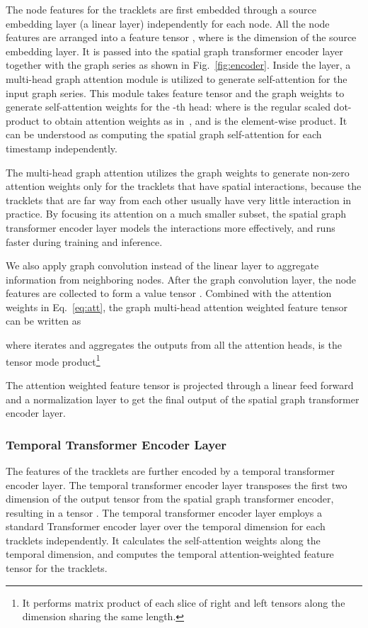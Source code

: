 \documentclass[10pt,twocolumn,letterpaper]{article}
\begin{document}
The node features for the tracklets are first embedded through a source embedding layer (a linear layer) independently for each node.  All the node features are arranged into a feature tensor  , where  is the dimension of the source embedding layer. It is passed into the spatial graph transformer encoder layer together with the graph series as shown in Fig.~\ref{fig:encoder}. Inside the layer, a multi-head graph attention module is utilized to generate self-attention for the input graph series. This module takes feature tensor  and the graph weights  to generate self-attention weights for the -th head:
\vspace{-1mm}
where  is the regular scaled dot-product to obtain attention weights as in~\cite{vaswani2017attention}, and  is the element-wise product. It can be understood as computing the spatial graph self-attention for each timestamp independently.

The multi-head graph attention utilizes the graph weights  to generate non-zero attention weights only for the tracklets that have spatial interactions, because the tracklets that are far way from each other usually have very little interaction in practice. By focusing its attention on a much smaller subset, the spatial graph transformer encoder layer models the interactions more effectively, and runs faster during training and inference.

We also apply graph convolution instead of the linear layer to aggregate information from neighboring nodes. After the graph convolution layer, the node features are collected to form a value tensor . Combined with the attention weights in Eq.~\ref{eq:att}, the graph multi-head attention weighted feature tensor can be written as 

where  iterates and aggregates the outputs from all the attention heads,  is the tensor mode product\footnote{It performs matrix product of each slice of right and left tensors along the dimension sharing the same length.}

The attention weighted feature tensor is projected through a linear feed forward and a normalization layer to get the final output of the spatial graph transformer encoder layer. 

\subsubsection{Temporal Transformer Encoder Layer}

The features of the tracklets are further encoded by a temporal transformer encoder layer. The temporal transformer encoder layer transposes the first two dimension of the output tensor from the spatial graph transformer encoder, resulting in a tensor . 
The temporal transformer encoder layer employs a standard Transformer encoder layer over the temporal dimension for each tracklets independently. 
It calculates the self-attention weights along the temporal dimension, and computes the temporal attention-weighted feature tensor for the tracklets.
\end{document}
